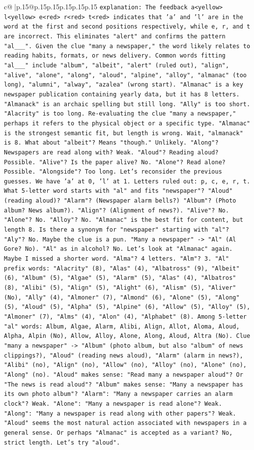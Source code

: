 \documentclass{article}
\begin{document}
{\begin{supertabular}{c@{$\;$}|p{.15\linewidth}@{}p{.15\linewidth}p{.15\linewidth}p{.15\linewidth}p{.15\linewidth}p{.15\linewidth}}
{{{                \texttt{explanation: The feedback a<yellow> l<yellow> e<red> r<red> t<red> indicates that 'a' and 'l' are in the word at the first and second positions respectively, while e, r, and t are incorrect. This eliminates "alert" and confirms the pattern "al\_\_\_". Given the clue "many a newspaper," the word likely relates to reading habits, formats, or news delivery. Common words fitting "al\_\_\_" include "album", "albeit", "alert" (ruled out), "align", "alive", "alone", "along", "aloud", "alpine", "alloy", "almanac" (too long), "alumni", "alway", "azalea" (wrong start). "Almanac" is a key newspaper publication containing yearly data, but it has 8 letters. "Almanack" is an archaic spelling but still long. "Ally" is too short. "Alacrity" is too long. Re{-}evaluating the clue "many a newspaper," perhaps it refers to the physical object or a specific type. "Almanac" is the strongest semantic fit, but length is wrong. Wait, "almanack" is 8. What about "albeit"? Means "though." Unlikely. "Along"? Newspapers are read along with? Weak. "Aloud"? Reading aloud? Possible. "Alive"? Is the paper alive? No. "Alone"? Read alone? Possible. "Alongside"? Too long. Let's reconsider the previous guesses. We have 'a' at 0, 'l' at 1. Letters ruled out: p, c, e, r, t. What 5{-}letter word starts with "al" and fits "newspaper"? "Aloud" (reading aloud)? "Alarm"? (Newspaper alarm bells?) "Album"? (Photo album? News album?). "Align"? (Alignment of news?). "Alive"? No. "Alone"? No. "Alloy"? No. "Almanac" is the best fit for content, but length 8. Is there a synonym for "newspaper" starting with "al"? "Aly"? No. Maybe the clue is a pun. "Many a newspaper" {-}> "Al" (Al Gore? No). "Al" as in alcohol? No. Let's look at "Almanac" again. Maybe I missed a shorter word. "Alma"? 4 letters. "Alm"? 3. "Al" prefix words: "Alacrity" (8), "Alas" (4), "Albatross" (9), "Albeit" (6), "Album" (5), "Algae" (5), "Alarm" (5), "Alas" (4), "Albatros" (8), "Alibi" (5), "Align" (5), "Alight" (6), "Alism" (5), "Aliver" (No), "Ally" (4), "Almoner" (7), "Almond" (6), "Alone" (5), "Along" (5), "Aloud" (5), "Alpha" (5), "Alpine" (6), "Allow" (5), "Alloy" (5), "Almoner" (7), "Alms" (4), "Alon" (4), "Alphabet" (8). Among 5{-}letter "al" words: Album, Algae, Alarm, Alibi, Align, Allot, Aloma, Aloud, Alpha, Alpin (No), Allow, Alloy, Alone, Along, Aloud, Altra (No). Clue "many a newspaper" {-}> "Album" (photo album, but also "album" of news clippings?), "Aloud" (reading news aloud), "Alarm" (alarm in news?), "Alibi" (no), "Align" (no), "Allow" (no), "Alloy" (no), "Alone" (no), "Along" (no). "Aloud" makes sense: "Read many a newspaper aloud"? Or "The news is read aloud"? "Album" makes sense: "Many a newspaper has its own photo album"? "Alarm": "Many a newspaper carries an alarm clock"? Weak. "Alone": "Many a newspaper is read alone"? Weak. "Along": "Many a newspaper is read along with other papers"? Weak. "Aloud" seems the most natural action associated with newspapers in a general sense. Or perhaps "Almanac" is accepted as a variant? No, strict length. Let's try "aloud".} \\
}}}
\end{supertabular}}
\end{document}
